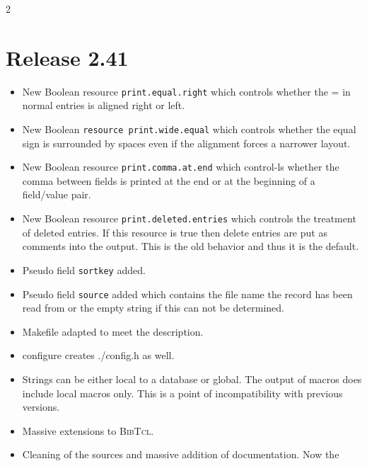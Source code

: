 \documentclass[11pt,a4paper]{scrartcl}
\newcommand\rsc[1]{\texttt{#1}}
\newcommand\File[1]{\textsf{#1}}
\newcommand\BibTcl{\textsc{BibTcl}}
\newenvironment{Releases}{\begin{multicols}2\RaggedRight}{\end{multicols}}
\newenvironment{Release}[2]{%
  \def\tmp{#2}%
  \section*{Release #1 \ifx\tmp\empty\else{\normalsize[#2]}\fi}
  \begin{itemize}
}{\end{itemize}}
\newenvironment{Fix}[1]{\item }{}
\newenvironment{New}[1]{\item }{}
\newenvironment{Doc}[1]{\item }{}
\begin{document}
\begin{Releases}
 \begin{Release}{2.41}{}
  \begin{New}{gene}
    New Boolean resource \rsc{print.equal.right} which controls whether
    the = in normal entries is aligned right or left.
  \end{New}
  \begin{New}{gene}
    New Boolean \rsc{resource print.wide.equal} which controls whether
    the equal sign is surrounded by spaces even if the alignment forces a
    narrower layout.
  \end{New}
  \begin{New}{gene}
    New Boolean resource \rsc{print.comma.at.end} which control-ls
    whether the comma between fields is printed at the end or at the beginning
    of a field/value pair.
  \end{New}
  \begin{New}{gene}
    New Boolean resource \rsc{print.deleted.entries} which controls the
    treatment of deleted entries. If this resource is true then delete entries
    are put as comments into the output. This is the old behavior and thus it
    is the default.
  \end{New}
  \begin{New}{gene}
    Pseudo field \rsc{sortkey} added.
  \end{New}
  \begin{New}{gene}
    Pseudo field \rsc{source} added which contains the file name the
    record has been read from or the empty string if this can not be
    determined.
  \end{New}
  \begin{Fix}{gene}
    Makefile adapted to meet the description.
  \end{Fix}
  \begin{New}{gene}
	configure creates \File{./config.h} as well.
  \end{New}
  \begin{New}{gene}
    Strings can be either local to a database or global. The output of macros
    does include local macros only. This is a point of incompatibility with
    previous versions.
  \end{New}
  \begin{New}{gene}
    Massive extensions to \BibTcl.
  \end{New}
  \begin{Doc}{gene}
    Cleaning of the sources and massive addition of documentation. Now the

\end{Doc}
\end{Release}
\end{Releases}
\end{document}
